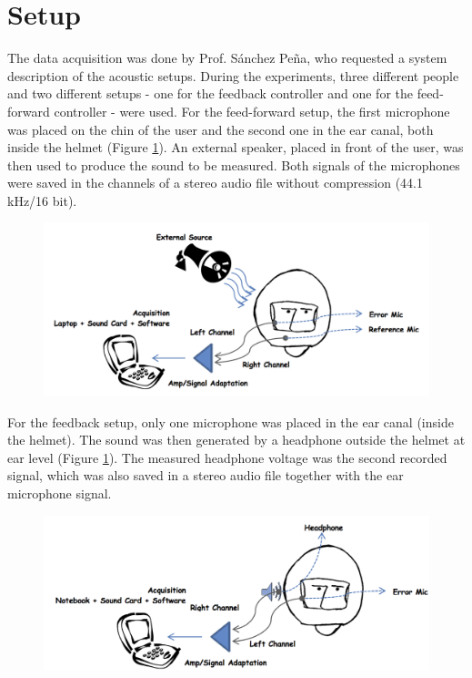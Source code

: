 \section{Setup}
The data acquisition was done by Prof. S\'{a}nchez Pe\~{n}a, who requested a system description of the acoustic setups. During the experiments, three different people and two different setups - one for the feedback controller and one for the feed-forward controller -  were used. For the feed-forward setup, the first microphone was placed on the chin of the user and the second one in the ear canal, both inside the helmet (Figure \ref{}). An external speaker, placed in front of the user, was then used to produce the sound to be measured. Both signals of the microphones were saved in the channels of a stereo audio file without compression (44.1 kHz/16 bit).\\

\begin{figure}[H]
\centering
\includegraphics[width=1.0\textwidth]{pics/setupff}
\caption{}
\label{pic:}
\end{figure}

For the feedback setup, only one microphone was placed in the ear canal (inside the helmet). The sound was then generated by a headphone outside the helmet at ear level (Figure \ref{}). The measured headphone voltage was the second recorded signal, which was also saved in a stereo audio file together with the ear microphone signal.

\begin{figure}[H]
\centering
\includegraphics[width=1.0\textwidth]{pics/setupfb}
\caption{}
\label{pic:}
\end{figure}

